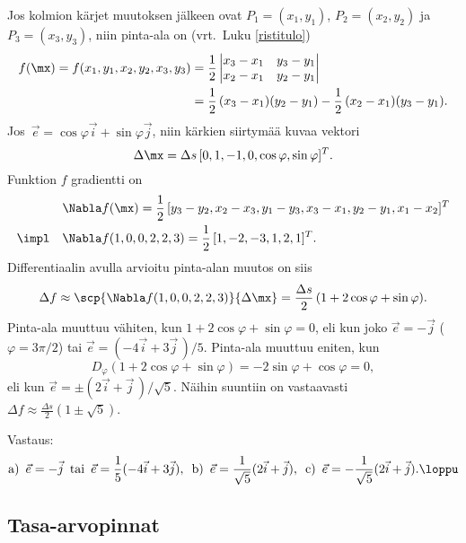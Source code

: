 \ratk Jos kolmion kärjet muutoksen jälkeen ovat $P_1=(x_1,y_1)$, $P_2=(x_2,y_2)$ ja 
$P_3=(x_3,y_3)$, niin pinta-ala on (vrt.\ Luku \ref{ristitulo})
\begin{align*}
f(\mx)=f(x_1,y_1,x_2,y_2,x_3,y_3) 
    &= \frac{1}{2}\begin{vmatrix} x_3-x_1 & y_3-y_1 \\ x_2-x_1 & y_2-y_1 \end{vmatrix} \\ 
    &= \frac{1}{2}\,(x_3-x_1)(y_2-y_1)-\frac{1}{2}\,(x_2-x_1)(y_3-y_1).
\end{align*}
Jos $\,\vec e = \cos\varphi\vec i + \sin\varphi\vec j$, niin kärkien siirtymää kuvaa vektori
\[
\Delta \mx = \Delta s\,[0,1,-1,0,\cos\varphi,\sin\varphi]^T.
\]
Funktion $f$ gradientti on
\begin{align*}
           &\Nabla f(\mx) = \frac{1}{2}\,[y_3-y_2,x_2-x_3,y_1-y_3,x_3-x_1,y_2-y_1,x_1-x_2]^T \\
\impl\quad &\Nabla f(1,0,0,2,2,3) = \frac{1}{2}\,[1,-2,-3,1,2,1]^T.
\end{align*}
Differentiaalin avulla arvioitu pinta-alan muutos on siis
\[
\Delta f \approx \scp{\Nabla f(1,0,0,2,2,3)}{\Delta\mx} 
         = \frac{\Delta s}{2}\,(1+2\cos\varphi+\sin\varphi).
\]
Pinta-ala muuttuu vähiten, kun $1+2\cos\varphi+\sin\varphi=0$, eli kun joko $\vec e=-\vec j$
($\varphi=3\pi/2$) tai $\vec e=(-4\vec i+3\vec j\,)/5$. Pinta-ala muuttuu eniten, kun 
\[
D_\varphi(1+2\cos\varphi+\sin\varphi)=-2\sin\varphi+\cos\varphi=0,
\]
eli kun $\vec e=\pm(2\vec i + \vec j\,)/\sqrt{5}$. Näihin suuntiin on vastaavasti
$\Delta f \approx \frac{\Delta s}{2}(1\pm\sqrt{5})$.

Vastaus:
\[
\text{a)}\,\ \vec e = -\vec j\,\ \text{tai}\,\ \vec e = \frac{1}{5}(-4\vec i+3\vec j), \,\
\text{b)}\,\ \vec e = \frac{1}{\sqrt{5}}(2\vec i + \vec j), \,\
\text{c)}\,\ \vec e = -\frac{1}{\sqrt{5}}(2\vec i + \vec j). \loppu
\]

\subsection*{Tasa-arvopinnat}

